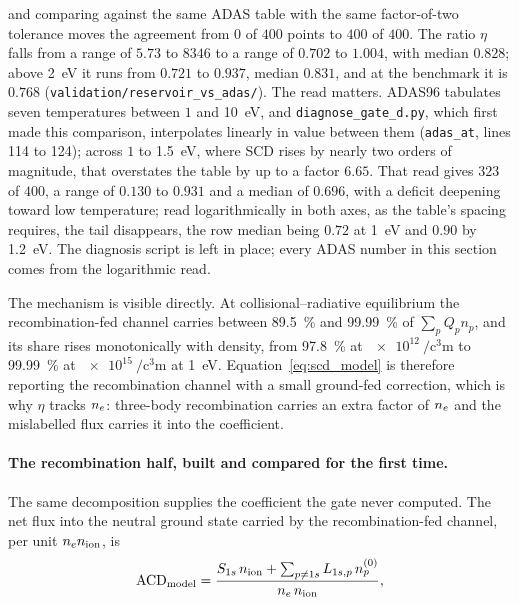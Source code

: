 \noindent and comparing against the same ADAS table with the same factor-of-two
tolerance moves the agreement from $0$ of $400$ points to $400$ of $400$. The
ratio $\eta$ falls from a range of $5.73$ to $8346$ to a range of $0.702$ to
$1.004$, with median $0.828$; above \SI{2}{\electronvolt} it runs from $0.721$
to $0.937$, median $0.831$, and at the benchmark it is $0.768$
(\texttt{validation/reservoir\_vs\_adas/}). The read matters. ADAS96
tabulates seven temperatures between $1$ and \SI{10}{\electronvolt}, and
\texttt{diagnose\_gate\_d.py}, which first made this comparison, interpolates
linearly in value between them (\texttt{adas\_at}, lines 114 to 124); across
$1$ to \SI{1.5}{\electronvolt}, where SCD rises by nearly two orders of
magnitude, that overstates the table by up to a factor $6.65$. That read gives
$323$ of $400$, a range of $0.130$ to $0.931$ and a median of $0.696$, with a deficit deepening toward low temperature; read logarithmically
in both axes, as the table's spacing requires, the tail disappears, the row
median being $0.72$ at \SI{1}{\electronvolt} and $0.90$ by
\SI{1.2}{\electronvolt}. The diagnosis script is left in place; every ADAS
number in this section comes from the logarithmic read.

The mechanism is visible directly. At collisional--radiative equilibrium the
recombination-fed channel carries between \SI{89.5}{\percent} and
\SI{99.99}{\percent} of $\sum_p Q_p n_p$, and its share rises monotonically with
density, from \SI{97.8}{\percent} at $\SI{e12}{\per\cubic\centi\metre}$ to
\SI{99.99}{\percent} at $\SI{e15}{\per\cubic\centi\metre}$ at
\SI{1}{\electronvolt}. Equation~\eqref{eq:scd_model} is therefore reporting the
recombination channel with a small ground-fed correction, which is why $\eta$
tracks $n_e$: three-body recombination carries an extra factor of $n_e$ and
the mislabelled flux carries it into the coefficient.

\paragraph{The recombination half, built and compared for the first time.}
The same decomposition supplies the coefficient the gate never computed. The net
flux into the neutral ground state carried by the recombination-fed channel,
per unit $n_en_{\mathrm{ion}}$, is
\begin{equation}
  {\rm ACD}_{\rm model}
  = \frac{S_{1s}\,n_{\mathrm{ion}} + \sum_{p \neq 1s} L_{1s,p}\,n^{(0)}_p}{n_e\,n_{\mathrm{ion}}},
  \label{eq:acd_groundfed}
\end{equation}

